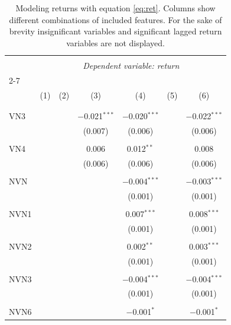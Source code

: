 
\begin{table}[!htbp] \centering 
  \caption{Modeling returns with equation \eqref{eq:ret}. Columns show different combinations of included features. For the sake of brevity insignificant variables and significant lagged return variables are not displayed. } 
  \label{Returnmodels1_t} 
\tiny 
\begin{tabular}{@{\extracolsep{5pt}}lcccccc} 
\\[-1.8ex]\hline 
\hline \\[-1.8ex] 
 & \multicolumn{6}{c}{\textit{Dependent variable: return}} \\ 
\cline{2-7} 
\\[-1.8ex] & (1) & (2) & (3) & (4) & (5) & (6)\\ 
\hline \\[-1.8ex] 
& & & & & & \\
 VN3 &  &  & $-$0.021$^{***}$ & $-$0.020$^{***}$ &  & $-$0.022$^{***}$ \\ 
 &  &  & (0.007) & (0.006) &  & (0.006) \\ 
 & & & & & & \\ 
 VN4 &  &  & 0.006 & 0.012$^{**}$ &  & 0.008 \\ 
 &  &  & (0.006) & (0.006) &  & (0.006) \\ 
 & & & & & & \\ 
 NVN &  &  &  & $-$0.004$^{***}$ &  & $-$0.003$^{***}$ \\ 
 &  &  &  & (0.001) &  & (0.001) \\ 
 & & & & & & \\ 
 NVN1 &  &  &  & 0.007$^{***}$ &  & 0.008$^{***}$ \\ 
 &  &  &  & (0.001) &  & (0.001) \\ 
 & & & & & & \\ 
 NVN2 &  &  &  & 0.002$^{**}$ &  & 0.003$^{***}$ \\ 
 &  &  &  & (0.001) &  & (0.001) \\ 
 & & & & & & \\ 
 NVN3 &  &  &  & $-$0.004$^{***}$ &  & $-$0.004$^{***}$ \\ 
 &  &  &  & (0.001) &  & (0.001) \\ 
 & & & & & & \\ 
 NVN6 &  &  &  & $-$0.001$^{*}$ &  & $-$0.001$^{*}$ \\ 

\end{tabular}
\end{table}
